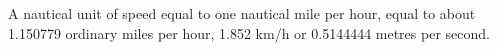 A nautical unit of speed equal to one nautical mile per hour,
equal to about 1.150779 ordinary miles per hour, 1.852 km/h or 0.5144444 metres
per second.